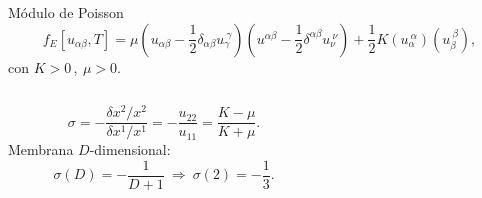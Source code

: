 \documentclass[xcolor=dvipsnames]{beamer}
\begin{document}
\begin{frame}{Módulo de Poisson}
\centering
\begin{equation*}
f_E[u_{\alpha\beta},T]=
\mu \left(u_{\alpha\beta}-\frac{1}{2}\delta_{\alpha\beta}u_{\gamma}^{\ \gamma}\right)
    \left(u^{\alpha\beta}-\frac{1}{2}\delta^{\alpha\beta}u_{\nu}^{\ \nu}\right)+
\frac{1}{2}K(u_{\alpha}^{\ \alpha})(u_{\beta}^{\ \beta}),
\end{equation*}
con $K>0\, ,\ \mu>0$.

\begin{columns}[T]
    \begin{column}{5.8cm}
      \centering
      \begin{equation*}
        \sigma=-\frac{\delta x^2 / x^2}{\delta x^1 / x^1}=-\frac{u_{22}}{u_{11}}=\frac{K-\mu}{K+\mu}.
      \end{equation*}
      Membrana $D$-dimensional:
      \begin{equation*}
        \sigma(D)=-\frac{1}{D+1}\ \Rightarrow \ \sigma(2)=-\frac{1}{3}. 
      \end{equation*}
    \end{column}
    \begin{column}{5.8cm}
      \centering
      \begin{figure}[h]
        \resizebox{\columnwidth}{!}{}
      \end{figure} 
    \end{column}
  \end{columns}
\end{frame}
\end{document}
